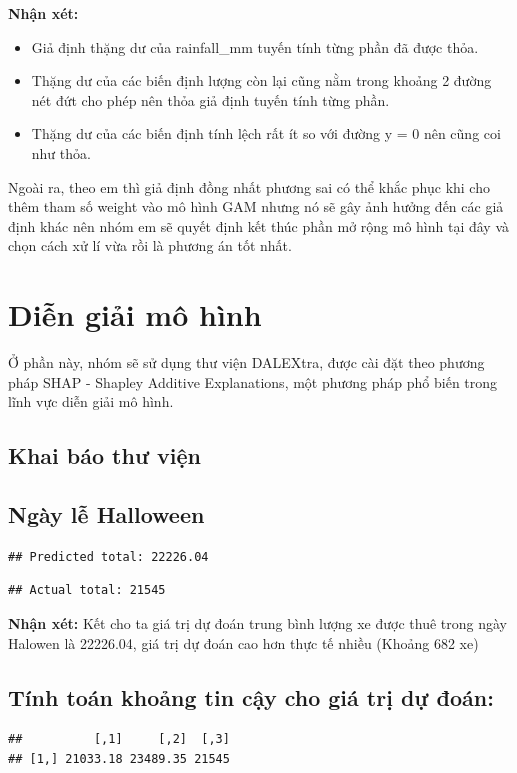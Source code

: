 \documentclass[
  11pt,
  letterpaper,
]{article}
\begin{document}
\textbf{Nhận xét:}

\begin{itemize}
\item Giả định thặng dư của rainfall\_mm tuyến tính từng phần đã được thỏa.
\item Thặng dư của các biến định lượng còn lại cũng nằm trong khoảng 2 đường nét đứt cho phép nên thỏa giả định tuyến tính từng phần.
\item Thặng dư của các biến định tính lệch rất ít so với đường y = 0 nên cũng coi như thỏa.
\end{itemize}
Ngoài ra, theo em thì giả định đồng nhất phương sai có thể khắc phục khi cho thêm tham số weight vào mô hình GAM nhưng nó sẽ gây ảnh hưởng đến các giả định khác nên nhóm em sẽ quyết định kết thúc phần mở rộng mô hình tại đây và chọn cách xử lí vừa rồi là phương án tốt nhất.
\section{Diễn giải mô hình}
Ở phần này, nhóm sẽ sử dụng thư viện DALEXtra, được cài đặt theo phương pháp SHAP - Shapley Additive Explanations, một phương pháp phổ biến trong lĩnh vực diễn giải mô hình.
\subsection{Khai báo thư viện}

\subsection{Ngày lễ Halloween}

\begin{verbatim}
## Predicted total: 22226.04
\end{verbatim}

\begin{verbatim}
## Actual total: 21545
\end{verbatim}

\textbf{Nhận xét:} Kết cho ta giá trị dự đoán trung bình lượng xe được thuê trong ngày Halowen là 22226.04, giá trị dự đoán cao hơn thực tế nhiều (Khoảng 682 xe)

\subsection{Tính toán khoảng tin cậy cho giá trị dự đoán:}

\begin{verbatim}
##          [,1]     [,2]  [,3]
## [1,] 21033.18 23489.35 21545
\end{verbatim}
\end{document}
